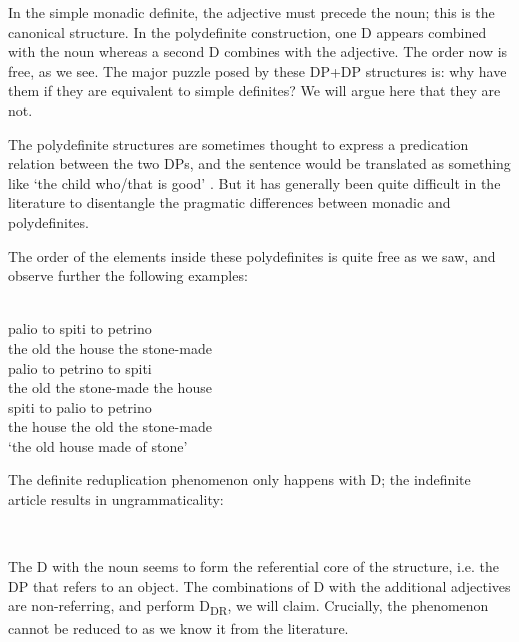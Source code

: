 \documentclass[output=paper,
modfonts
]{langscibook}
\begin{document}
In the simple monadic definite, the adjective must precede the noun; this is the canonical structure. In the polydefinite construction, one D appears combined with the noun whereas a second D combines with the adjective. The order now is free, as we see. The major puzzle posed by these DP+DP{\cb} structures is: why have them if they are equivalent to simple definites? We will argue here that they are not.

The polydefinite structures are sometimes thought to express a predication relation between the two DPs, and the sentence would be translated as something like `the child who/that is good' \citep{AlexiadouWilder1998b, CamposStravrou2004}. But it has generally been quite difficult in the literature to disentangle the pragmatic differences between monadic and polydefinites.

The order of the elements inside these polydefinites is quite free as we saw, and observe further the following examples:

\ea\label{ex:etxeberria:43}  \\
\ea 
{} {palio} {to} {spiti} {to} {petrino}\\
the old the house the stone-made\\
\ex
{} {palio} {to} {petrino} {to} {spiti}\\
the old the stone-made the house\\
\ex
{} {spiti} {to} {palio} {to} {petrino}\\
the house the old the stone-made\\
\glt `the old house made of stone'
\z
\z

The definite reduplication phenomenon only happens with D; the indefinite article results in ungrammaticality: 

\ea\label{ex:etxeberria:44}  \\
\z
\z

The D with the noun seems to form the referential core of the structure, i.e.  the DP that refers to an object. The combinations of D with the additional adjectives are non-referring, and perform D\textsubscript{DR}, we will claim. Crucially, the phenomenon cannot be reduced to  as we know it from the literature.
\end{document}
